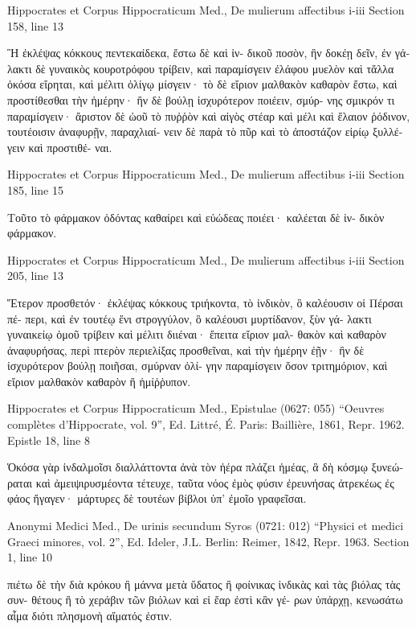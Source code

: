 \documentclass[12pt,letterpaper,twoside,final]{memoir}
\begin{document}
\begin{greek}
Hippocrates et Corpus Hippocraticum Med., De mulierum affectibus i-iii 
Section 158, line 13

              Ἢ ἐκλέψας κόκκους πεντεκαίδεκα, ἔστω δὲ καὶ ἰν-
δικοῦ ποσὸν, ἢν δοκέῃ δεῖν, ἐν γάλακτι δὲ γυναικὸς κουροτρόφου 
τρίβειν, καὶ παραμίσγειν ἐλάφου μυελὸν καὶ τἄλλα ὁκόσα εἴρηται, 
καὶ μέλιτι ὀλίγῳ μίσγειν· τὸ δὲ εἴριον μαλθακὸν καθαρὸν ἔστω, καὶ 
προστίθεσθαι τὴν ἡμέρην· ἢν δὲ βούλῃ ἰσχυρότερον ποιέειν, σμύρ-
νης σμικρόν τι παραμίσγειν· ἄριστον δὲ ὠοῦ τὸ πυῤῥὸν καὶ αἰγὸς 
στέαρ καὶ μέλι καὶ ἔλαιον ῥόδινον, τουτέοισιν ἀναφυρῇν, παραχλιαί-
νειν δὲ παρὰ τὸ πῦρ καὶ τὸ ἀποστάζον εἰρίῳ ξυλλέγειν καὶ προστιθέ-
ναι. 



Hippocrates et Corpus Hippocraticum Med., De mulierum affectibus i-iii 
Section 185, line 15

                                                              Τοῦτο τὸ 
φάρμακον ὀδόντας καθαίρει καὶ εὐώδεας ποιέει· καλέεται δὲ ἰν-
δικὸν φάρμακον. 



Hippocrates et Corpus Hippocraticum Med., De mulierum affectibus i-iii 
Section 205, line 13

                                                 Ἕτερον προσθετόν· 
ἐκλέψας κόκκους τριήκοντα, τὸ ἰνδικὸν, ὃ καλέουσιν οἱ Πέρσαι πέ-
περι, καὶ ἐν τουτέῳ ἔνι στρογγύλον, ὃ καλέουσι μυρτίδανον, ξὺν γά-
λακτι γυναικείῳ ὁμοῦ τρίβειν καὶ μέλιτι διιέναι· ἔπειτα εἴριον μαλ-
θακὸν καὶ καθαρὸν ἀναφυρήσας, περὶ πτερὸν περιελίξας προσθεῖναι, 
καὶ τὴν ἡμέρην ἐῇν· ἢν δὲ ἰσχυρότερον βούλῃ ποιῆσαι, σμύρναν ὀλί-
γην παραμίσγειν ὅσον τριτημόριον, καὶ εἴριον μαλθακὸν καθαρὸν ἢ 
ἡμίῤῥυπον. 



Hippocrates et Corpus Hippocraticum Med., Epistulae (0627: 055)
“Oeuvres complètes d'Hippocrate, vol. 9”, Ed. Littré, É.
Paris: Baillière, 1861, Repr. 1962.
Epistle 18, line 8

                                                  Ὁκόσα γὰρ ἰνδαλμοῖσι 
διαλλάττοντα ἀνὰ τὸν ἠέρα πλάζει ἡμέας, ἃ δὴ κόσμῳ ξυνεώραται   
καὶ ἀμειψιρυσμέοντα τέτευχε, ταῦτα νόος ἐμὸς φύσιν ἐρευνήσας 
ἀτρεκέως ἐς φάος ἤγαγεν· μάρτυρες δὲ τουτέων βίβλοι ὑπ' ἐμοῖο 
γραφεῖσαι. 



Anonymi Medici Med., De urinis secundum Syros (0721: 012)
“Physici et medici Graeci minores, vol. 2”, Ed. Ideler, J.L.
Berlin: Reimer, 1842, Repr. 1963.
Section 1, line 10

                           πιέτω δὲ τὴν διὰ κρόκου ἢ μάννα 
μετὰ ὕδατος ἢ φοίνικας ἰνδικὰς καὶ τὰς βιόλας τὰς συν-
θέτους ἢ τὸ χεράβιν τῶν βιόλων καὶ εἰ ἔαρ ἐστὶ κἂν γέ-
ρων ὑπάρχῃ, κενωσάτω αἷμα διότι πλησμονὴ αἵματός ἐστιν. 




\end{greek}
\end{document}
